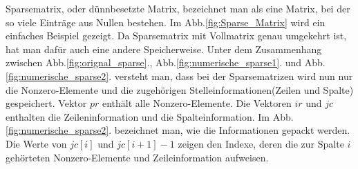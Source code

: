 
Sparsematrix, oder dünnbesetzte Matrix,  bezeichnet man als eine Matrix, bei der so viele Einträge aus Nullen bestehen. Im Abb.\ref{fig:Sparse_Matrix} wird ein einfaches Beispiel gezeigt.
Da Sparsematrix mit Vollmatrix genau umgekehrt ist, hat man dafür auch eine andere Speicherweise. Unter dem Zusammenhang zwischen Abb.\ref{fig:orignal_sparse}., Abb.\ref{fig:numerische_sparse1}. und Abb.\ref{fig:numerische_sparse2}. versteht man, dass bei der Sparsematrizen wird nun nur die Nonzero-Elemente und die zugehörigen Stelleinformationen(Zeilen und Spalte) gespeichert. Vektor $pr$ enthält alle Nonzero-Elemente. Die Vektoren $ir$ und $jc$ enthalten die Zeileninformation und die Spalteinformation. Im Abb.\ref{fig:numerische_sparse2}. bezeichnet man, wie die Informationen gepackt werden. Die Werte von $jc[i]$ und $jc[i+1]-1$ zeigen den Indexe, deren die zur Spalte $i$  gehörteten Nonzero-Elemente und Zeileinformation aufweisen.




